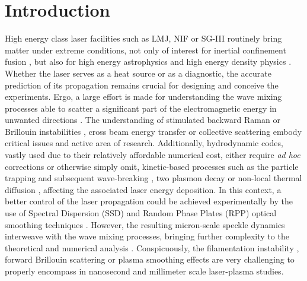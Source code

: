 \documentclass[
 reprint,
 amsmath,amssymb,
 aps,
]{revtex4-1}
\begin{document}
\section{Introduction}
High energy class laser facilities such as LMJ,  NIF or SG-III routinely bring matter under extreme conditions, not only of interest for inertial confinement fusion \cite{Cavailler_2005,Lindl_2004,MRE_Zheng_2017}, but also for high energy astrophysics  and high energy density physics   \cite{Drake2006}. 
Whether  the laser   serves as a heat source or as a diagnostic, the accurate prediction of its propagation remains crucial for designing and  conceive the experiments. 
Ergo, a large effort is made for understanding the wave mixing processes able to scatter a significant part of the electromagnetic energy in unwanted directions \cite[]{Shen_1965,Forslund_1973}. 
The understanding of stimulated backward Raman or Brillouin instabilities  \cite{POP_Liu_2009,hao_2013},  cross beam energy transfer \cite{hao_2016}  or collective scattering  \cite[]{PRL_Neuville_2016,PRL_Depierreux_2016} embody critical issues and active area of research.
Additionally, hydrodynamic codes, vastly used due to their relatively affordable numerical cost, either require \emph{ad hoc} corrections or otherwise simply  omit, kinetic-based processes such as the particle trapping and subsequent wave-breaking \cite[]{POP_Benisti_2008,POP_Berger_2013}, two plasmon decay \cite[]{Dubois_1995,Russell_2001} or non-local thermal diffusion \cite[]{POP_Schurtz_2000,PRL_Froula_2007}, affecting the associated laser energy deposition. 
In this context, a better control of the laser propagation could be achieved experimentally by the use of Spectral Dispersion (SSD) and  Random Phase Plates (RPP) optical smoothing techniques  \cite[]{Kato_1984,Skupski_1989,NatPhys_Glenzer,NatPhys_Labaune}.  
However, the resulting micron-scale speckle dynamics  interweave with the wave mixing processes, bringing further complexity to the theoretical and numerical analysis \cite[]{POP_Duluc_2019}. 
Conspicuously, the filamentation instability \cite[]{phd_Michel,POP_michel_2003,Lushnikov_2006,PRL_Sarri_2011}, forward Brillouin  scattering or plasma smoothing effects \cite[]{phd-Grech,POP_Grech_2006,PRL_Grech_2009} 
are very challenging to properly encompass  in nanosecond and millimeter scale laser-plasma studies.
\end{document}
